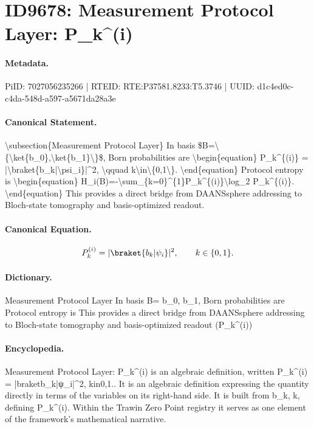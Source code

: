 \section*{ID9678: Measurement Protocol Layer: P\_k\textasciicircum{}(i)}
\paragraph{Metadata.}
PiID: 7027056235266 | RTEID: RTE:P37581.8233:T5.3746 | UUID: d1c4ed0c-c4da-548d-a597-a5671da28a3e

\paragraph{Canonical Statement.}
\textbackslash{}subsection\{Measurement Protocol Layer\} In basis \$B=\textbackslash{}\{\textbackslash{}ket\{b\_0\},\textbackslash{}ket\{b\_1\}\textbackslash{}\}\$, Born probabilities are \textbackslash{}begin\{equation\} P\_k\textasciicircum{}\{(i)\} = |\textbackslash{}braket\{b\_k|\textbackslash{}psi\_i\}|\textasciicircum{}2, \textbackslash{}qquad k\textbackslash{}in\textbackslash{}\{0,1\textbackslash{}\}. \textbackslash{}end\{equation\} Protocol entropy is \textbackslash{}begin\{equation\} H\_i(B)=-\textbackslash{}sum\_\{k=0\}\textasciicircum{}\{1\}P\_k\textasciicircum{}\{(i)\}\textbackslash{}log\_2 P\_k\textasciicircum{}\{(i)\}. \textbackslash{}end\{equation\} This provides a direct bridge from DAANSsphere addressing to Bloch-state tomography and basis-optimized readout.

\paragraph{Canonical Equation.}
\[
P_k^{(i)} = |\braket{b_k|\psi_i}|^2, \qquad k\in\{0,1\}.
\]

\paragraph{Dictionary.}
Measurement Protocol Layer In basis B= b\_0, b\_1, Born probabilities are Protocol entropy is This provides a direct bridge from DAANSsphere addressing to Bloch-state tomography and basis-optimized readout (P\_k\textasciicircum{}(i))

\paragraph{Encyclopedia.}
Measurement Protocol Layer: P\_k\textasciicircum{}(i) is an algebraic definition, written P\_k\textasciicircum{}(i) = |braketb\_k|ψ\_i|\textasciicircum{}2, kin0,1.. It is an algebraic definition expressing the quantity directly in terms of the variables on its right-hand side. It is built from b\_k, k, defining P\_k\textasciicircum{}(i). Within the Trawin Zero Point registry it serves as one element of the framework's mathematical narrative.
